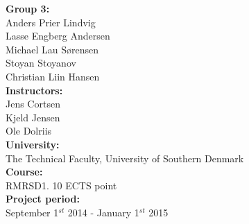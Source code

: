 \begin{minipage}{\textwidth}
\flushright

{\bfseries Group 3:\\}
Anders Prier Lindvig \\
Lasse Engberg Andersen  \\
Michael Lau Sørensen \\
Stoyan Stoyanov \\
Christian Liin Hansen \\ 
[1ex]

 {\bfseries Instructors:\\}
Jens Cortsen \\
Kjeld Jensen \\
Ole Dolriis \\
[1ex]


{\bfseries University:\\}
The Technical Faculty, University of Southern Denmark\\
[1ex]


{\bfseries Course:\\}
RMRSD1. 10 ECTS point\\
[1ex]

{\bfseries Project period:\\}
September 1$^{st}$ 2014 - January 1$^{st}$ 2015 \\

\end{minipage}